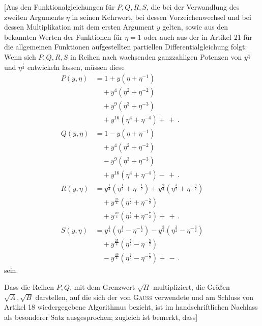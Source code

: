 \begingroup
\renewcommand{\arraystretch}{1.45}
[Aus den Funktionalgleichungen für $P,\allowbreak Q,\allowbreak R,\allowbreak S$, die bei der Verwandlung des zweiten Arguments $\eta$ in seinen Kehrwert, bei dessen Vorzeichenwechsel und bei dessen Multiplikation mit dem ersten Argument $y$ gelten, sowie aus den bekannten Werten der Funktionen für $\eta=1$ oder auch aus der in Artikel 21 für die allgemeinen Funktionen aufgestellten partiellen Differentialgleichung folgt: Wenn sich $P,\allowbreak Q,\allowbreak R,\allowbreak S$ in Reihen nach wachsenden ganzzahligen Potenzen von $y^{\frac14}$ und $\eta^{\frac12}$ entwickeln lassen, müssen diese
\[
\begin{aligned}
P(y,\eta)&=1+y(\eta+\eta^{-1})\\[4pt]&\quad{}+y^4(\eta^2+\eta^{-2})\\[4pt]&\quad{}+y^9(\eta^3+\eta^{-3})\\[4pt]&\quad{}+y^{16}(\eta^4+\eta^{-4})+\,+\,.\\[10pt]
Q(y,\eta)&=1-y(\eta+\eta^{-1})\\[4pt]&\quad{}+y^4(\eta^2+\eta^{-2})\\[4pt]&\quad{}-y^9(\eta^3+\eta^{-3})\\[4pt]&\quad{}+y^{16}(\eta^4+\eta^{-4})-\,+\,.\\[10pt]
R(y,\eta)&=y^{\frac14}(\eta^{\frac12}+\eta^{-\frac12})+y^{\frac94}(\eta^{\frac32}+\eta^{-\frac32})\\[4pt]&\quad{}+y^{\frac{25}4}(\eta^{\frac52}+\eta^{-\frac52})\\[4pt]&\quad{}+y^{\frac{49}4}(\eta^{\frac72}+\eta^{-\frac72})+\,+\,.\\[10pt]
S(y,\eta)&=y^{\frac14}(\eta^{\frac12}-\eta^{-\frac12})-y^{\frac94}(\eta^{\frac32}-\eta^{-\frac32})\\[4pt]&\quad{}+y^{\frac{25}4}(\eta^{\frac52}-\eta^{-\frac52})\\[4pt]&\quad{}-y^{\frac{49}4}(\eta^{\frac72}-\eta^{-\frac72})+\,-\,.
\end{aligned}
\]
sein.

Dass die Reihen $P,\allowbreak Q$, mit dem Grenzwert $\surd  H$ multipliziert, die Größen $\surd  A,\allowbreak \surd  B$ darstellen, auf die sich der von \textsc{Gauss} verwendete und am Schluss von Artikel 18 wiedergegebene Algorithmus bezieht, ist im handschriftlichen Nachlass als besonderer Satz ausgesprochen; zugleich ist bemerkt, dass]

